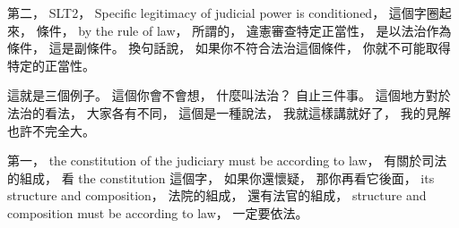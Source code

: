 \hypertarget{w02:cue:1281}{}第二，
\hypertarget{w02:cue:1282}{}SLT2，
\hypertarget{w02:cue:1283}{}Specific legitimacy of judicial power is conditioned，
\hypertarget{w02:cue:1284}{}這個字圈起來，
\hypertarget{w02:cue:1285}{}條件，
\hypertarget{w02:cue:1286}{}by the rule of law，
\hypertarget{w02:cue:1287}{}所謂的，
\hypertarget{w02:cue:1288}{}違憲審查特定正當性，
\hypertarget{w02:cue:1289}{}是以法治作為條件，
\hypertarget{w02:cue:1290}{}這是副條件。
\hypertarget{w02:cue:1291}{}換句話說，
\hypertarget{w02:cue:1292}{}如果你不符合法治這個條件，
\hypertarget{w02:cue:1293}{}你就不可能取得特定的正當性。

\hypertarget{w02:cue:1294}{}這就是三個例子。
\hypertarget{w02:cue:1295}{}這個你會不會想，
\hypertarget{w02:cue:1296}{}什麼叫法治？
\hypertarget{w02:cue:1297}{}自止三件事。
\hypertarget{w02:cue:1298}{}這個地方對於法治的看法，
\hypertarget{w02:cue:1299}{}大家各有不同，
\hypertarget{w02:cue:1300}{}這個是一種說法，
\hypertarget{w02:cue:1301}{}我就這樣講就好了，
\hypertarget{w02:cue:1302}{}我的見解也許不完全大。

\hypertarget{w02:cue:1303}{}第一，
\hypertarget{w02:cue:1304}{}the constitution of the judiciary must be according to law，
\hypertarget{w02:cue:1305}{}有關於司法的組成，
\hypertarget{w02:cue:1306}{}看 the constitution 這個字，
\hypertarget{w02:cue:1307}{}如果你還懷疑，
\hypertarget{w02:cue:1308}{}那你再看它後面，
\hypertarget{w02:cue:1309}{}its structure and composition，
\hypertarget{w02:cue:1310}{}法院的組成，
\hypertarget{w02:cue:1311}{}還有法官的組成，
\hypertarget{w02:cue:1312}{}structure and composition must be according to law，
\hypertarget{w02:cue:1313}{}一定要依法。

